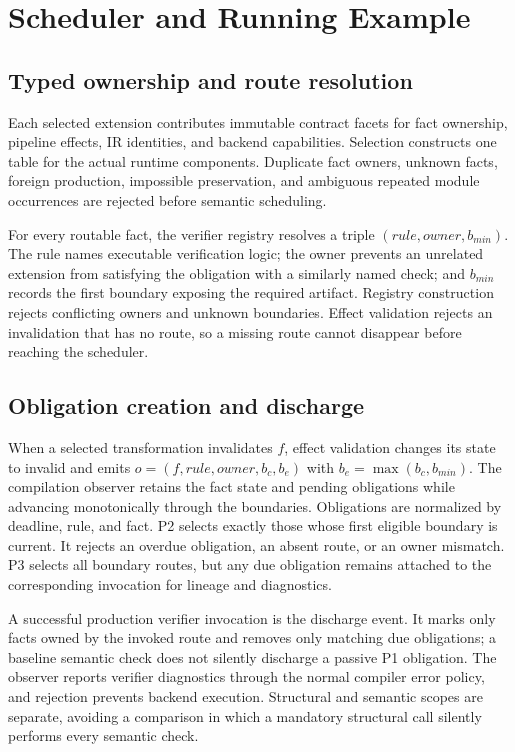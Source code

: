 \section{Scheduler and Running Example}
\subsection{Typed ownership and route resolution}
Each selected extension contributes immutable contract facets for fact ownership, pipeline effects, IR identities, and backend capabilities. Selection constructs one table for the actual runtime components. Duplicate fact owners, unknown facts, foreign production, impossible preservation, and ambiguous repeated module occurrences are rejected before semantic scheduling.

For every routable fact, the verifier registry resolves a triple $(rule,owner,b_{min})$. The rule names executable verification logic; the owner prevents an unrelated extension from satisfying the obligation with a similarly named check; and $b_{min}$ records the first boundary exposing the required artifact. Registry construction rejects conflicting owners and unknown boundaries. Effect validation rejects an invalidation that has no route, so a missing route cannot disappear before reaching the scheduler.

\subsection{Obligation creation and discharge}
When a selected transformation invalidates $f$, effect validation changes its state to invalid and emits $o=(f,rule,owner,b_c,b_e)$ with $b_e=\max(b_c,b_{min})$. The compilation observer retains the fact state and pending obligations while advancing monotonically through the boundaries. Obligations are normalized by deadline, rule, and fact. P2 selects exactly those whose first eligible boundary is current. It rejects an overdue obligation, an absent route, or an owner mismatch. P3 selects all boundary routes, but any due obligation remains attached to the corresponding invocation for lineage and diagnostics.

A successful production verifier invocation is the discharge event. It marks only facts owned by the invoked route and removes only matching due obligations; a baseline semantic check does not silently discharge a passive P1 obligation. The observer reports verifier diagnostics through the normal compiler error policy, and rejection prevents backend execution. Structural and semantic scopes are separate, avoiding a comparison in which a mandatory structural call silently performs every semantic check.

